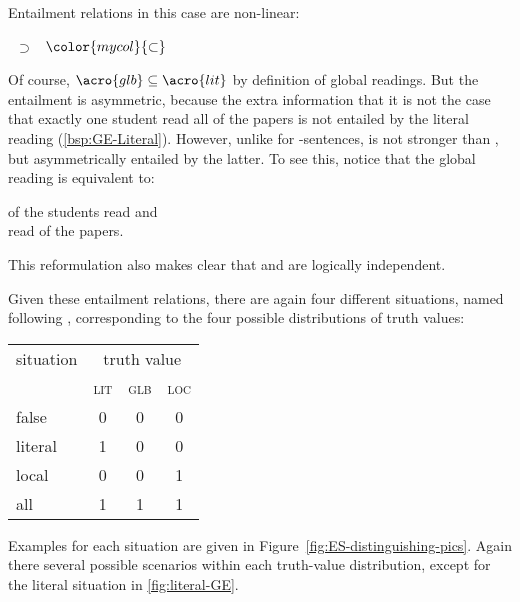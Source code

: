 \documentclass[fleqn,reqno,10pt,draft]{article}
\newcommand{\lit}{\acro{lit}}
\newcommand{\glb}{\acro{glb}}
\newcommand{\loc}{\acro{loc}}
\newcommand{\as}{\acro{as}}
\begin{document}
\noindent Entailment relations in this case are non-linear:
\begin{exe}
  \ex \label{bsp:Entailments-GE}       \lit\ $\supset$ \glb\ $\color{mycol}{\subset}$ \loc 
\end{exe}
Of course, $\glb \subseteq \lit$ by definition of global readings. But
the entailment is asymmetric, because the extra information that it is
not the case that exactly one student read all of the papers is not
entailed by the literal reading (\ref{bsp:GE-Literal}). However,
unlike for \as-sentences, \loc is not stronger than \glb, but
asymmetrically entailed by the latter. To see this, notice that the
global reading is equivalent to:

\begin{exe}
    of the students read  and \\
   read  of the papers.
\end{exe}

\noindent This reformulation also makes clear that \loc and \lit are
logically independent.

Given these entailment relations, there are again four different
situations, named following \citet{ChemlaSpector2010:Experimental-Ev},
corresponding to the four possible distributions of truth values:

\begin{center}
  \begin{tabular}{lccc}
    \toprule
    situation    & \multicolumn{3}{c}{truth value} 
  \\ 
  \cmidrule(r){2-4}
    & \textsc{lit} & \textsc{glb} & \textsc{loc} \\ \midrule
    false   & 0 & 0 & 0 \\
    literal & 1 & 0 & 0 \\
    local   & 0 & 0 & 1 \\
    all     & 1 & 1 & 1 \\ \bottomrule
  \end{tabular}
\end{center}

\noindent Examples for each situation are given in
Figure~\ref{fig:ES-distinguishing-pics}. Again there several possible
scenarios within each truth-value distribution, except for the literal
situation in \ref{fig:literal-GE}.
\end{document}
